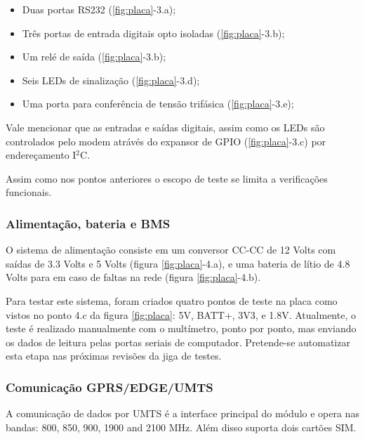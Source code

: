                 \begin{itemize}
                    \item Duas portas RS232 (\ref{fig:placa}-3.a);
                    \item Três portas de entrada digitais opto isoladas (\ref{fig:placa}-3.b); 
                    \item Um relé de saída (\ref{fig:placa}-3.b);
                    \item Seis LEDs de sinalização (\ref{fig:placa}-3.d);
                    \item Uma porta para conferência de tensão trifásica (\ref{fig:placa}-3.e);
                \end{itemize}
                
                Vale mencionar que as entradas e saídas digitais, assim como os LEDs são controlados pelo modem atrávés do expansor de GPIO (\ref{fig:placa}-3.c) por endereçamento I$^{2}$C.
                
                Assim como nos pontos anteriores o escopo de teste se limita a verificações funcionais.
                
            \subsubsection{Alimentação, bateria e BMS}
                O sistema de alimentação consiste em um conversor CC-CC de 12 Volts com saídas de 3.3 Volts e 5 Volts (figura \ref{fig:placa}-4.a), e uma bateria de lítio de 4.8 Volts para em caso de faltas na rede (figura \ref{fig:placa}-4.b). 
                
                Para testar este sistema, foram criados quatro pontos de teste na placa como vistos no ponto 4.c da figura \ref{fig:placa}: 5V, BATT+, 3V3, e 1.8V. Atualmente, o teste é realizado manualmente com o multímetro, ponto por ponto, mas enviando os dados de leitura pelas portas seriais de computador. Pretende-se automatizar esta etapa nas próximas revisões da jiga de testes.
                
            \subsubsection{Comunicação GPRS/EDGE/UMTS}
                A comunicação de dados por UMTS é a interface principal do módulo e opera nas bandas: 800, 850, 900, 1900 and 2100 MHz. Além disso suporta dois cartões SIM.
                
